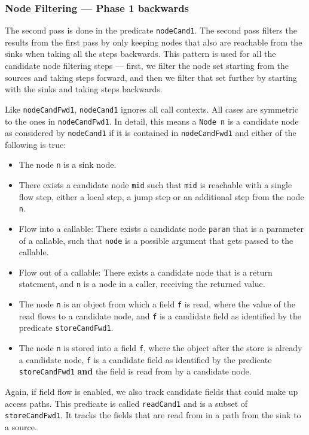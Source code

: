 \subsubsection*{Node Filtering --- Phase 1 backwards}
The second pass is done in the predicate \texttt{nodeCand1}.
The second pass filters the results from the first pass by only keeping nodes
that also are reachable from the sinks when taking all the steps backwards.
This pattern is used for all the candidate node filtering steps --- first, we 
filter the node set starting from the sources and taking steps forward,
and then we filter that set further by starting with the sinks and taking steps backwards.

Like \texttt{nodeCandFwd1}, \texttt{nodeCand1} ignores all call contexts.
All cases are symmetric to the ones in \texttt{nodeCandFwd1}.
In detail, this means a \texttt{Node n} is a candidate node as considered by 
\texttt{nodeCand1} if it is contained in 
\texttt{nodeCandFwd1} and either of the following is true:
\begin{itemize}
    \item The node \texttt{n} is a sink node.
    \item There exists a candidate node \texttt{mid} such that \texttt{mid} is reachable with a single flow step,
    either a local step, a jump step or an additional step from the node \texttt{n}.
    \item Flow into a callable:
    There exists a candidate node \texttt{param} that is a parameter of a callable,
    such that \texttt{node} is a possible argument that gets passed to the callable.
    \item Flow out of a callable:
    There exists a candidate node that is a return statement, and \texttt{n} is 
    a node in a caller, receiving the returned value.
    \item The node \texttt{n} is an object from which a field \texttt{f} is read,
    where the value of the read flows to a candidate node, and \texttt{f}
    is a candidate field as identified by the predicate \texttt{storeCandFwd1}.
    \item The node \texttt{n} is stored into a field \texttt{f}, where the
    object after the store is already a candidate node, \texttt{f} is a
    candidate field as identified by the predicate \texttt{storeCandFwd1}
    \textbf{and} the field is read from by a candidate node.
\end{itemize}

Again, if field flow is enabled, we also track candidate fields that could make up 
access paths. This predicate is called \texttt{readCand1} and is a subset of 
\texttt{storeCandFwd1}.
It tracks the fields that are read from in a path from the sink to a source.

